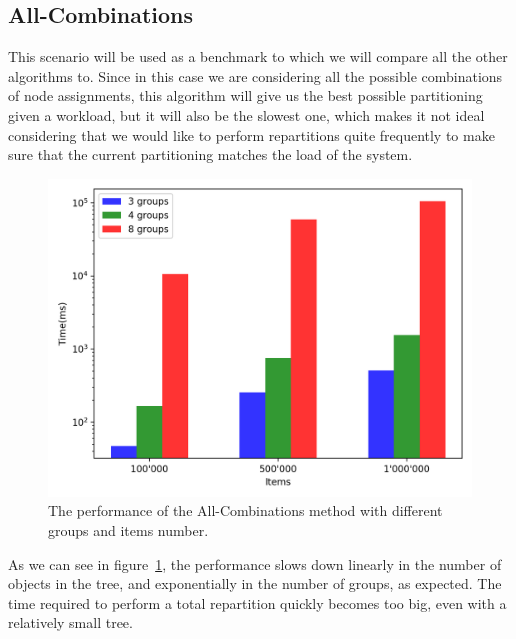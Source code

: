 
\subsection{All-Combinations}\label{sec:All-Combinations}
This scenario will be used as a benchmark to which we will compare all the other algorithms to. Since in this case we are considering all the possible combinations of node assignments, this algorithm will give us the best possible partitioning given a workload, but it will also be the slowest one, which makes it not ideal considering that we would like to perform repartitions quite frequently to make sure that the current partitioning matches the load of the system.

\begin{figure}[!htb]
  \centering
  \includegraphics[width=\textwidth,height=\textheight,keepaspectratio]{img/all.png}
  \caption[caption]{The performance of the All-Combinations method with different groups and items number.}
  \label{fig:all}
\end{figure}

As we can see in figure~\ref{fig:all}, the performance slows down linearly in the number of objects in the tree, and exponentially in the number of groups, as expected. The time required to perform a total repartition quickly becomes too big, even with a relatively small tree.


